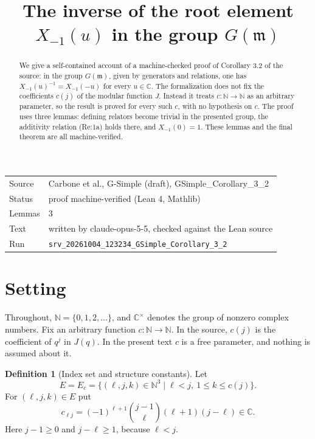 \documentclass[11pt]{article}
\title{The inverse of the root element $X_{-1}(u)$ in the group $G(\mathfrak{m})$}
\date{}
\theoremstyle{definition}
\newtheorem{definition}[theorem]{Definition}
\theoremstyle{remark}
\newcommand{\CC}{\mathbb{C}}
\newcommand{\NN}{\mathbb{N}}
\begin{document}
\maketitle
\begin{abstract}
We give a self-contained account of a machine-checked proof of Corollary 3.2 of the source: in the group $G(\mathfrak{m})$, given by generators and relations, one has $X_{-1}(u)^{-1}=X_{-1}(-u)$ for every $u\in\mathbb{C}$. The formalization does not fix the coefficients $c(j)$ of the modular function $J$. Instead it treats $c\colon\mathbb{N}\to\mathbb{N}$ as an arbitrary parameter, so the result is proved for every such $c$, with no hypothesis on $c$. The proof uses three lemmas: defining relators become trivial in the presented group, the additivity relation (Re:1a) holds there, and $X_{-1}(0)=1$. These lemmas and the final theorem are all machine-verified.
\end{abstract}

\begin{center}\small
\begin{tabular}{@{}ll@{}}
\toprule
Source & Carbone et al., G-Simple (draft), GSimple\_Corollary\_3\_2 \\
Status & proof machine-verified (Lean 4, Mathlib) \\
Lemmas & 3 \\
Text & written by claude-opus-5-5, checked against the Lean source \\
Run & \texttt{srv\_20261004\_123234\_GSimple\_Corollary\_3\_2} \\
\bottomrule
\end{tabular}
\end{center}

\tableofcontents

\section{Setting}

Throughout, $\NN=\{0,1,2,\dots\}$, and $\CC^\times$ denotes the group of nonzero complex numbers. Fix an arbitrary function $c\colon\NN\to\NN$. In the source, $c(j)$ is the coefficient of $q^j$ in $J(q)$. In the present text $c$ is a free parameter, and nothing is assumed about it.

\begin{definition}[Index set and structure constants]
Let
\[
E=E_c=\{(\ell,j,k)\in\NN^3 \mid \ell<j,\ 1\le k\le c(j)\}.
\]
For $(\ell,j,k)\in E$ put
\[
c_{\ell j}=(-1)^{\ell+1}\binom{j-1}{\ell}(\ell+1)(j-\ell)\in\CC .
\]
Here $j-1\ge 0$ and $j-\ell\ge 1$, because $\ell<j$.
\end{definition}
\end{document}
